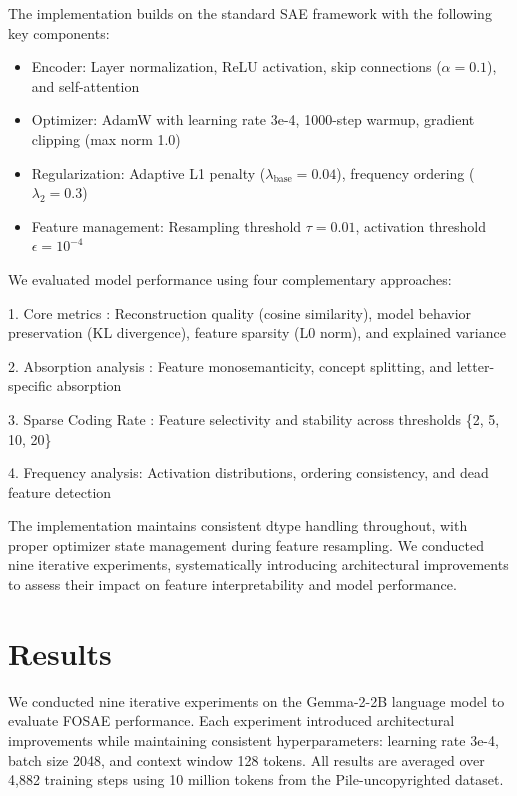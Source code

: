 \documentclass{article} %
\begin{document}
The implementation builds on the standard SAE framework with the following key components:

\begin{itemize}
    \item Encoder: Layer normalization, ReLU activation, skip connections ($\alpha=0.1$), and self-attention
    \item Optimizer: AdamW with learning rate 3e-4, 1000-step warmup, gradient clipping (max norm 1.0)
    \item Regularization: Adaptive L1 penalty ($\lambda_{\text{base}}=0.04$), frequency ordering ($\lambda_2=0.3$)
    \item Feature management: Resampling threshold $\tau=0.01$, activation threshold $\epsilon=10^{-4}$
\end{itemize}

We evaluated model performance using four complementary approaches:

1. Core metrics \cite{gaoScalingEvaluatingSparse}: Reconstruction quality (cosine similarity), model behavior preservation (KL divergence), feature sparsity (L0 norm), and explained variance

2. Absorption analysis \cite{chaninAbsorptionStudyingFeature2024}: Feature monosemanticity, concept splitting, and letter-specific absorption

3. Sparse Coding Rate \cite{gurneeFindingNeuronsHaystack2023}: Feature selectivity and stability across thresholds \{2, 5, 10, 20\}

4. Frequency analysis: Activation distributions, ordering consistency, and dead feature detection

The implementation maintains consistent dtype handling throughout, with proper optimizer state management during feature resampling. We conducted nine iterative experiments, systematically introducing architectural improvements to assess their impact on feature interpretability and model performance.

\section{Results}
\label{sec:results}

We conducted nine iterative experiments on the Gemma-2-2B language model to evaluate FOSAE performance. Each experiment introduced architectural improvements while maintaining consistent hyperparameters: learning rate 3e-4, batch size 2048, and context window 128 tokens. All results are averaged over 4,882 training steps using 10 million tokens from the Pile-uncopyrighted dataset.
\end{document}
